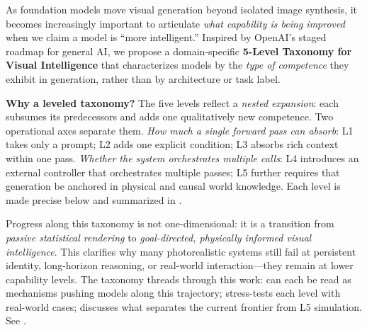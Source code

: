 \documentclass{llmxive}
\begin{document}
As foundation models move visual generation beyond isolated image synthesis, it becomes increasingly important to articulate \emph{what capability is being improved} when we claim a model is ``more intelligent.'' Inspired by OpenAI's staged roadmap for general AI, we propose a domain-specific \textbf{5-Level Taxonomy for Visual Intelligence} that characterizes models by the \emph{type of competence} they exhibit in generation, rather than by architecture or task label.

\textbf{Why a leveled taxonomy?} The five levels reflect a \emph{nested expansion}: each subsumes its predecessors and adds one qualitatively new competence. Two operational axes separate them. \emph{How much a single forward pass can absorb}: L1 takes only a prompt; L2 adds one explicit condition; L3 absorbs rich context within one pass. \emph{Whether the system orchestrates multiple calls}: L4 introduces an external controller that orchestrates multiple passes; L5 further requires that generation be anchored in physical and causal world knowledge. Each level is made precise below and summarized in .

Progress along this taxonomy is not one-dimensional: it is a transition from \emph{passive statistical rendering} to \emph{goal-directed, physically informed visual intelligence}. This clarifies why many photorealistic systems still fail at persistent identity, long-horizon reasoning, or real-world interaction---they remain at lower capability levels. The taxonomy threads through this work:  can each be read as mechanisms pushing models along this trajectory;  stress-tests each level with real-world cases;  discusses what separates the current frontier from L5 simulation. See .
\end{document}
